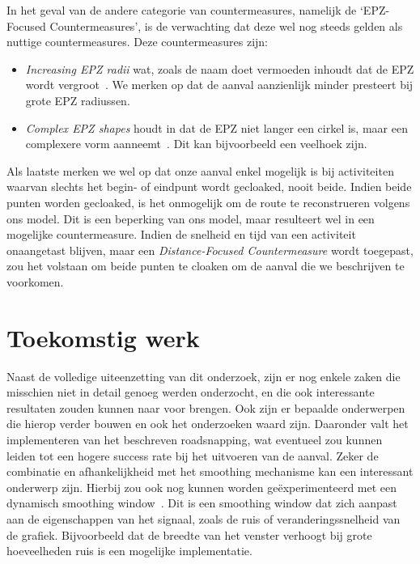 In het geval van de andere categorie van countermeasures, namelijk de
`EPZ-Focused Countermeasures', is de verwachting dat deze wel nog steeds gelden
als nuttige countermeasures. Deze countermeasures zijn:
\begin{itemize}
    \item \textit{Increasing \ac{EPZ} radii} wat, zoals de naam doet vermoeden inhoudt dat de \ac{EPZ} wordt vergroot~\cite{Dhondt}. We merken op dat de aanval
          aanzienlijk minder presteert bij grote \ac{EPZ} radiussen.
    \item \textit{Complex \ac{EPZ} shapes} houdt in dat de \ac{EPZ} niet langer een cirkel is, maar een
          complexere vorm aanneemt~\cite{Dhondt}. Dit kan bijvoorbeeld een veelhoek zijn.
\end{itemize}

Als laatste merken we wel op dat onze aanval enkel mogelijk is bij activiteiten
waarvan slechts het begin- of eindpunt wordt gecloaked, nooit beide. Indien
beide punten worden gecloaked, is het onmogelijk om de route te reconstrueren
volgens ons model. Dit is een beperking van ons model, maar resulteert wel in
een mogelijke countermeasure. Indien de snelheid en tijd van een activiteit
onaangetast blijven, maar een \textit{Distance-Focused Countermeasure} wordt
toegepast, zou het volstaan om beide punten te cloaken om de aanval die we
beschrijven te voorkomen.

\section{Toekomstig werk}
Naast de volledige uiteenzetting van dit onderzoek, zijn er nog enkele zaken
die misschien niet in detail genoeg werden onderzocht, en die ook interessante
resultaten zouden kunnen naar voor brengen. Ook zijn er bepaalde onderwerpen
die hierop verder bouwen en ook het onderzoeken waard zijn. Daaronder valt het
implementeren van het beschreven roadsnapping, wat eventueel zou kunnen leiden
tot een hogere success rate bij het uitvoeren van de aanval. Zeker de
combinatie en afhankelijkheid met het smoothing mechanisme kan een interessant
onderwerp zijn. Hierbij zou ook nog kunnen worden geëxperimenteerd met een
dynamisch smoothing window~\cite{shmoothing}. Dit is een smoothing window dat
zich aanpast aan de eigenschappen van het signaal, zoals de ruis of
veranderingssnelheid van de grafiek. Bijvoorbeeld dat de breedte van het
venster verhoogt bij grote hoeveelheden ruis is een mogelijke implementatie.

